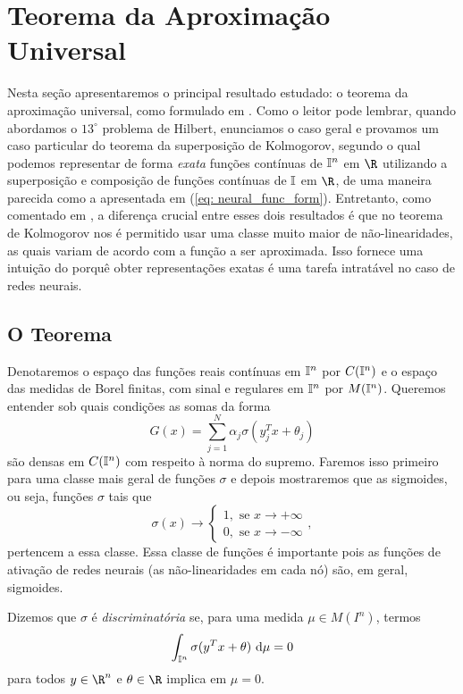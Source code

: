 
\section{Teorema da Aproximação Universal}

Nesta seção apresentaremos o principal resultado estudado: o teorema da aproximação universal, como formulado em \cite{cybenko89}.
Como o leitor pode lembrar, quando abordamos o \( 13^{ \circ } \) problema de Hilbert, enunciamos o caso geral e provamos um caso particular do teorema da superposição de Kolmogorov, segundo o qual podemos representar de forma \emph{exata} funções contínuas de \( \mathbb{I}^{ n } \) em \( \R \) utilizando a superposição e composição de funções contínuas de \( \mathbb{I} \) em \( \R \), de uma maneira parecida como a apresentada em (\ref{eq: neural_func_form}).
Entretanto, como comentado em \cite{cybenko89}, a diferença crucial entre esses dois resultados é que no teorema de Kolmogorov nos é permitido usar uma classe muito maior de não-linearidades, as quais variam de acordo com a função a ser aproximada.
Isso fornece uma intuição do porquê obter representações exatas é uma tarefa intratável no caso de redes neurais.

\subsection{O Teorema}

Denotaremos o espaço das funções reais contínuas em \( \mathbb{I}^{ n } \) por \( C(\mathbb{I}^{ n }) \) e o espaço das medidas de Borel finitas, com sinal e regulares em \( \mathbb{I}^{ n } \) por \( M(\mathbb{I}^{ n }) \).
Queremos entender sob quais condições as somas da forma \[
    G(x) = \sum_{ j=1 }^{ N } \alpha_{ j } \sigma(y_{ j }^{ T }x + \theta_{ j })
\]
são densas em \( C(\mathbb{I}^{ n }) \) com respeito à norma do supremo.
Faremos isso primeiro para uma classe mais geral de funções \( \sigma \) e depois mostraremos que as sigmoides, ou seja, funções \( \sigma \) tais que \[
    \sigma(x) \to
    \begin{cases}
        1, \text{ se } x \to +\infty \\
        0, \text{ se } x \to -\infty
    \end{cases}
,\]
pertencem a essa classe.
Essa classe de funções é importante pois as funções de ativação de redes neurais (as não-linearidades em cada nó) são, em geral, sigmoides.

\begin{defn}
    Dizemos que \( \sigma \) é \emph{discriminatória} se, para uma medida \( \mu \in M(I^{ n }) \), termos \[
        \int_{ \mathbb{I}^{ n } } \sigma(y^{ T }x + \theta)  \ \mathrm{d}\mu = 0
    \]
    para todos \( y \in \R^{ n } \) e \( \theta \in \R \) implica em \( \mu = 0 \).
\end{defn}

